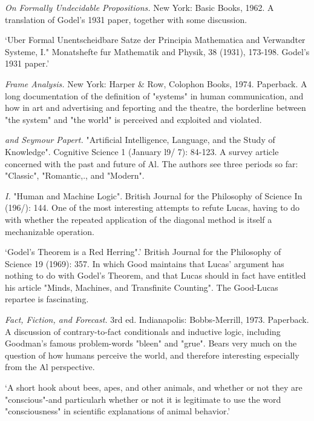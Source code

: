  {\sl On Formally Undecidable Propositions.} \llap{**\enspace}New York: Basic Books, 1962. A translation of Godel's 1931 paper, together with some discussion.

 `Uber Formal Unentscheidbare Satze der Principia Mathematica and Verwandter Systeme, I." Monatshefte fur Mathematik and Physik, 38 (1931), 173-198. Godel's 1931 paper.' 

 {\sl Frame Analysis.} New York: Harper \& Row, Colophon Books, 1974. Paperback. A long documentation of the definition of "systems" in human communication, and how in art and advertising and feporting and the theatre, the borderline between "the system" and "the world" is perceived and exploited and violated.

 {\sl and Seymour Papert.} "Artificial Intelligence, Language, and the Study of Knowledge". Cognitive Science 1 (January l9/ 7): 84-123. A survey article concerned with the past and future of Al. The authors see three periods so far: "Classic", "Romantic,., and "Modern".

 {\sl I.} "Human and Machine Logic". British Journal for the Philosophy of Science In (196/): 144. One of the most interesting attempts to refute Lucas, having to do with whether the repeated application of the diagonal method is itself a mechanizable operation.

 `Godel's Theorem is a Red Herring".' British Journal for the Philosophy of Science 19 (1969): 357. In which Good maintains that Lucas' argument has nothing to do with Godel's Theorem, and that Lucas should in fact have entitled his article "Minds, Machines, and Transfinite Counting". The Good-Lucas repartee is fascinating.

 {\sl Fact, Fiction, and Forecast.} 3rd ed. Indianapolis: Bobbs-Merrill, 1973. Paperback. A discussion of contrary-to-fact conditionals and inductive logic, including Goodman's famous problem-words "bleen" and "grue". Bears very much on the question of how humans perceive the world, and therefore interesting especially from the Al perspective.

 `A short hook about bees, apes, and other animals, and whether or not they are "conscious"-and particularh whether or not it is legitimate to use the word "consciousness" in scientific explanations of animal behavior.' 

